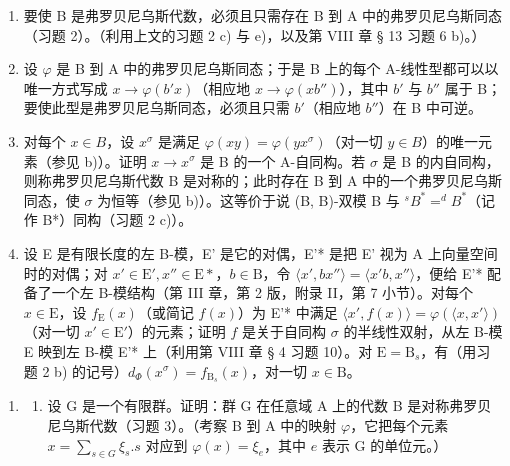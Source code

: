 \begin{enumerate}
\def\labelenumi{\alph{enumi})}
\item
  要使 B 是弗罗贝尼乌斯代数，必须且只需存在 B 到 A 中的弗罗贝尼乌斯同态（习题 2）。（利用上文的习题 2 c) 与 e)，以及第 VIII 章 § 13 习题 6 b)。）
\item
  设 \(\varphi\) 是 B 到 A 中的弗罗贝尼乌斯同态；于是 B 上的每个 A-线性型都可以以唯一方式写成 \(x \to \varphi(b'x)\)（相应地 \(x \to \varphi(xb'')\)），其中 \(b'\) 与 \(b''\) 属于 B；要使此型是弗罗贝尼乌斯同态，必须且只需 \(b'\)（相应地 \(b''\)）在 B 中可逆。
\item
  对每个 \(x \in B\)，设 \(x^{\sigma}\) 是满足 \(\varphi(xy) = \varphi(yx^{\sigma})\)（对一切 \(y \in B\)）的唯一元素（参见 b)）。证明 \(x \to x^{\sigma}\) 是 B 的一个 A-自同构。若 \(\sigma\) 是 B 的内自同构，则称弗罗贝尼乌斯代数 B 是对称的；此时存在 B 到 A 中的一个弗罗贝尼乌斯同态，使 \(\sigma\) 为恒等（参见 b)）。这等价于说 (B, B)-双模 B 与 \(^{s}B^{*} = ^{d}B^{*}\)（记作 B*）同构（习题 2 c)）。
\item
  设 E 是有限长度的左 B-模，E' 是它的对偶，E'* 是把 E' 视为 A 上向量空间时的对偶；对 \(x' \in \mathrm{E}', x'' \in \mathrm{E}*\)，\(b \in \mathrm{B}\)，令 \(\langle x', bx'' \rangle = \langle x'b, x'' \rangle\)，便给 E'* 配备了一个左 B-模结构（第 III 章，第 2 版，附录 II，第 7 小节）。对每个 \(x \in \mathrm{E}\)，设 \(f_{\mathrm{E}}(x)\)（或简记 \(f(x)\)）为 E'* 中满足 \(\langle x', f(x) \rangle = \varphi(\langle x, x' \rangle)\)（对一切 \(x' \in \mathrm{E}'\)）的元素；证明 \(f\) 是关于自同构 \(\sigma\) 的半线性双射，从左 B-模 E 映到左 B-模 E'* 上（利用第 VIII 章 § 4 习题 10）。对 \(\mathrm{E} = \mathrm{B}_s\)，有（用习题 2 b) 的记号）\(d_{\Phi}(x^{\sigma}) = f_{\mathrm{B}_s}(x)\)，对一切 \(x \in \mathrm{B}\)。
\end{enumerate}

\begin{enumerate}
\def\labelenumi{\arabic{enumi})}
\setcounter{enumi}{3}
\tightlist
\item
  \begin{enumerate}
  \def\labelenumii{\alph{enumii})}
  \tightlist
  \item
    设 G 是一个有限群。证明：群 G 在任意域 A 上的代数 B 是对称弗罗贝尼乌斯代数（习题 3）。（考察 B 到 A 中的映射 \(\varphi\)，它把每个元素 \(x = \sum_{s \in G} \xi_s.s\) 对应到 \(\varphi(x) = \xi_e\)，其中 \(e\) 表示 G 的单位元。）
  \end{enumerate}
\end{enumerate}

